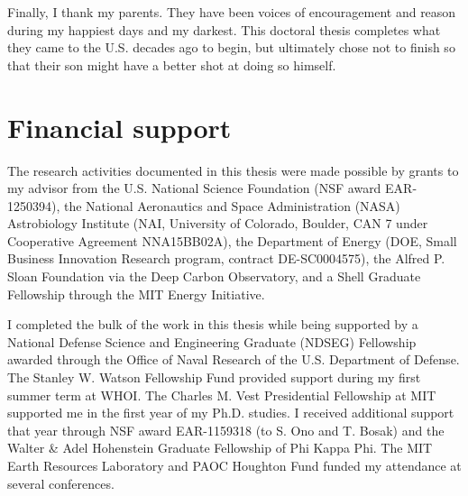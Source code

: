 Finally, I thank my parents. They have been voices of encouragement and
reason during my happiest days and my darkest. This doctoral thesis
completes what they came to the U.S. decades ago to begin, but
ultimately chose not to finish so that their son might have a better
shot at doing so himself.

\clearpage

\section{Financial support}

The research activities documented in this thesis were made possible by
grants to my advisor from the U.S. National Science Foundation
(NSF award EAR-1250394), the
National Aeronautics and Space Administration (NASA) Astrobiology
Institute (NAI, University of Colorado, Boulder, CAN 7 under
Cooperative Agreement NNA15BB02A), the Department of Energy (DOE, Small Business Innovation Research program, contract DE-SC0004575),
the Alfred P. Sloan Foundation via the Deep Carbon Observatory, and a
Shell Graduate Fellowship through the MIT Energy Initiative.

I completed the bulk of the work in this thesis while being supported by
a National Defense Science and Engineering Graduate (NDSEG) Fellowship
awarded through the Office of Naval Research of the U.S. Department of
Defense. The Stanley W. Watson Fellowship Fund provided support during
my first summer term at WHOI. The Charles M. Vest Presidential
Fellowship at MIT supported me in the first year of my Ph.D. studies. I
received additional support that year through NSF award EAR-1159318
(to S. Ono and T. Bosak) and the Walter \& Adel Hohenstein
Graduate Fellowship of Phi Kappa Phi.  The MIT Earth Resources Laboratory 
and PAOC Houghton Fund funded my attendance at several conferences.